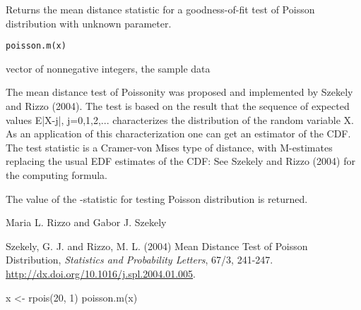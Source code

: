 \documentclass{article}
\begin{document}
\begin{Description}\relax
Returns the mean distance statistic for a goodness-of-fit test of Poisson distribution with unknown parameter.
\end{Description}
\begin{Usage}
\begin{verbatim}
poisson.m(x)
\end{verbatim}
\end{Usage}
\begin{Arguments}
\begin{ldescription}
\item[\code{x}] vector of nonnegative integers, the sample data 
\end{ldescription}
\end{Arguments}
\begin{Details}\relax
The mean distance test of Poissonity was proposed and implemented by Szekely and Rizzo (2004). The test is based on the result that the sequence of expected values E|X-j|, j=0,1,2,... characterizes the distribution of the random variable X. As an application of this characterization one can get an estimator  of the CDF. The test statistic is a Cramer-von Mises type of distance, with M-estimates replacing the usual EDF estimates of the CDF: 
 See Szekely and Rizzo (2004) for the computing formula.
\end{Details}
\begin{Value}
The value of the -statistic for testing Poisson distribution is returned.\end{Value}
\begin{Author}\relax
Maria L. Rizzo  and
Gabor J. Szekely 
\end{Author}
\begin{References}\relax
Szekely, G. J. and Rizzo, M. L. (2004) Mean Distance Test of Poisson Distribution, \emph{Statistics and Probability Letters}, 
67/3, 241-247. \url{http://dx.doi.org/10.1016/j.spl.2004.01.005}.
\end{References}
\begin{SeeAlso}\relax
{}
\end{SeeAlso}
\begin{Examples}
\begin{ExampleCode}
 x <- rpois(20, 1)
poisson.m(x)
 \end{ExampleCode}
\end{Examples}
\end{document}
